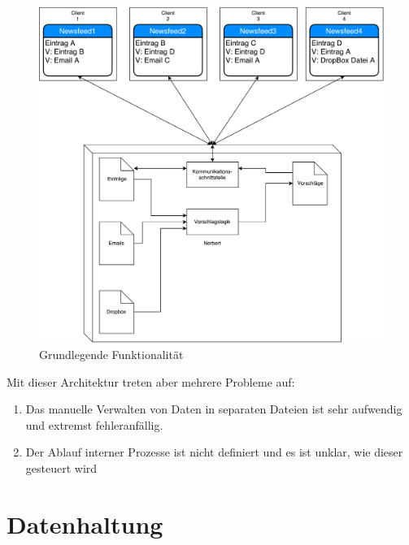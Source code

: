   	
\begin{figure}[H]
\centering
\includegraphics[scale=0.6]{uml-diagramms/overview_hlvl.pdf}
\caption{Grundlegende Funktionalität}
\label{fig: Overview_HLVL}
\end{figure}

Mit dieser Architektur treten aber mehrere Probleme auf:
  	\begin{enumerate}
  	\item Das manuelle Verwalten von Daten in separaten Dateien ist sehr aufwendig und extremst fehleranfällig.
  	\item Der Ablauf interner Prozesse ist nicht definiert und es ist unklar, wie dieser gesteuert wird
  	\end{enumerate}

\section{Datenhaltung}

